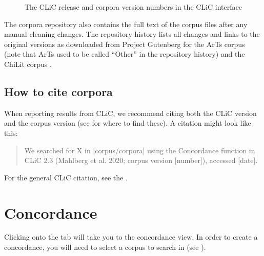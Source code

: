 \documentclass[letterpaper,10pt,english]{sphinxmanual}
\begin{document}
\begin{figure}[htbp]
\centering
\capstart

\noindent{}
\caption{The CLiC release and corpora version numbers in the CLiC interface}\label{\detokenize{cliccorpora:id10}}\label{\detokenize{cliccorpora:figure-version-numbers}}\end{figure}

\sphinxAtStartPar
The corpora repository also contains the full text of the corpus files
after any manual cleaning changes. The repository history lists all
changes and links to the original versions as downloaded from Project
Gutenberg for the ArTs corpus 
(note that ArTs used to be called “Other” in the repository history) and the
ChiLit corpus .


\section{How to cite corpora}
\label{\detokenize{cliccorpora:how-to-cite-corpora}}
\sphinxAtStartPar
When reporting results from CLiC, we recommend citing both the CLiC
version and the corpus version (see {\hyperref[\detokenize{cliccorpora:versioning-and-reproducibility}]{}} for where to find these). A citation
might look like this:
\begin{quote}

\sphinxAtStartPar
We searched for X in {[}corpus/corpora{]} using the Concordance function
in CLiC 2.3 (Mahlberg et al. 2020; corpus version {[}number{]}),
accessed {[}date{]}.
\end{quote}

\sphinxAtStartPar
For the general CLiC citation, see the {\hyperref[\detokenize{introduction:citing-clic}]{}}.

\sphinxstepscope


\chapter{Concordance}
\label{\detokenize{clicanalysis/concordance:concordance}}\label{\detokenize{clicanalysis/concordance:id1}}\label{\detokenize{clicanalysis/concordance::doc}}
\sphinxAtStartPar
Clicking onto the  tab will take you to the concordance
view. In order to create a concordance, you will need to select a corpus
to search in (see {\hyperref[\detokenize{cliccorpora:the-clic-corpora}]{}}).
\end{document}
